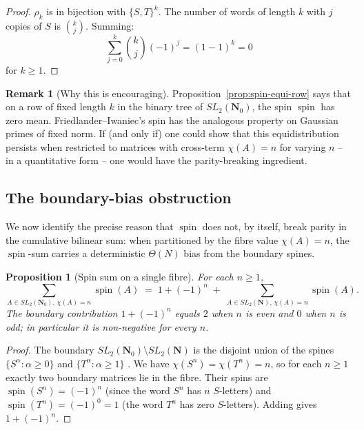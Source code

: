 \documentclass[11pt]{article}
\newtheorem{proposition}[theorem]{Proposition}
\theoremstyle{definition}
\newtheorem{remark}[theorem]{Remark}
\newcommand{\N}{\mathbf{N}}
\newcommand{\Nz}{\mathbf{N}_0}
\newcommand{\SLNz}{SL_2(\Nz)}
\newcommand{\SLN}{SL_2(\N)}
\DeclareMathOperator{\spin}{spin}
\begin{document}
\begin{proof}
$\rho_{k}$ is in bijection with $\{S,T\}^{k}$. The number of words of
length $k$ with $j$ copies of $S$ is $\binom{k}{j}$. Summing:
\[
\sum_{j=0}^{k}\binom{k}{j}(-1)^{j}=(1-1)^{k}=0
\]
for $k\ge 1$.
\end{proof}

\begin{remark}[Why this is encouraging]
Proposition~\ref{prop:spin-equi-row} says that on a row of fixed length
$k$ in the binary tree of $\SLNz$, the spin $\spin$ has zero mean.
Friedlander--Iwaniec's spin has the analogous property on Gaussian
primes of fixed norm. If (and only if) one could show that this
equidistribution persists when restricted to matrices with cross-term
$\chi(A)=n$ for varying $n$ -- in a quantitative form -- one would have
the parity-breaking ingredient.
\end{remark}

\subsection{The boundary-bias obstruction}

We now identify the precise reason that $\spin$ does not, by itself,
break parity in the cumulative bilinear sum: when partitioned by the
fibre value $\chi(A)=n$, the $\spin$-sum carries a deterministic
$\Theta(N)$ bias from the boundary spines.

\begin{proposition}[Spin sum on a single fibre]\label{prop:fibre-spin-sum}
For each $n\ge 1$,
\begin{equation}\label{eq:fibre-spin}
\sum_{A\in\SLNz,\,\chi(A)=n}\spin(A)\;=\;1+(-1)^{n}\;+\;
\sum_{A\in\SLN,\,\chi(A)=n}\spin(A).
\end{equation}
The boundary contribution $1+(-1)^{n}$ equals $2$ when $n$ is even and
$0$ when $n$ is odd; in particular it is non-negative for every $n$.
\end{proposition}

\begin{proof}
The boundary $\SLNz\setminus\SLN$ is the disjoint union of the spines
$\{S^{\alpha}:\alpha\ge 0\}$ and $\{T^{\alpha}:\alpha\ge 1\}$
\cite[Rem.\ 1.4]{shakov}. We have $\chi(S^{n})=\chi(T^{n})=n$, so for
each $n\ge 1$ exactly two boundary matrices lie in the fibre. Their
spins are $\spin(S^{n})=(-1)^{n}$ (since the word $S^{n}$ has $n$
$S$-letters) and $\spin(T^{n})=(-1)^{0}=1$ (the word $T^{n}$ has zero
$S$-letters). Adding gives $1+(-1)^{n}$.
\end{proof}
\end{document}

